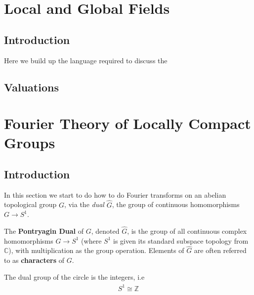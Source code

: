 \documentclass[11pt, x11names]{book}
\newcommand{\zz}{\mathbb{Z}}
\newcommand{\cc}{\mathbb{C}}
\renewcommand{\hat}{\widehat}
\begin{document}
\newpage

\section{Local and Global Fields}
\label{section: Local and Global Fields}

\subsection*{Introduction}
Here we build up the language required to discuss the 

\subsection{Valuations}



\newpage
\section{Fourier Theory of Locally Compact Groups}
\label{section: Pontryagin Duality}

\subsection*{Introduction}
In this section we start to do how to do Fourier transforms on an abelian topological group $G$, via the \textit{dual} $\hat{G}$, the group of continuous homomorphisms $G \to S^1$. 

\begin{defn}
The \textbf{Pontryagin Dual} of $G$, denoted $\hat{G}$, is the group of all continuous
complex homomorphisms $G \to S^1$ (where $S^1$ is given its standard subspace topology
from $\cc$), with multiplication as the group operation. Elements of $\hat{G}$ are often
referred to as \textbf{characters} of $G$.
\end{defn}

\begin{example}
\label{example: dual of S^1 is Z}
    The dual group of the circle is the integers, i.e
    \begin{equation*}
        \hat{S^1} \cong \zz
    \end{equation*}
\end{example}
\end{document}
